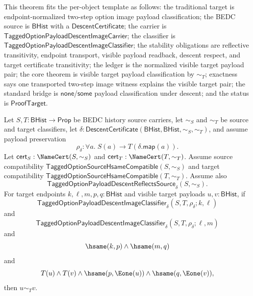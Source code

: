 \begin{theorem}
\label{thm:tagged-option-payload-descent-image-classifier-reflective-transitive-transported-visible-target-payload-classification}
This theorem fits the per-object template as follows: the traditional target is
endpoint-normalized two-step option image payload classification; the BEDC
source is $\mathsf{BHist}$ with a $\mathsf{DescentCertificate}$; the carrier is
$\mathsf{TaggedOptionPayloadDescentImageCarrier}$; the classifier is
$\mathsf{TaggedOptionPayloadDescentImageClassifier}$; the stability obligations
are reflective transitivity, endpoint transport, visible payload readback,
descent respect, and target certificate transitivity; the ledger is the
normalized visible target payload pair; the core theorem is visible target
payload classification by $\sim_T$; exactness says one transported two-step
image witness explains the visible target pair; the standard bridge is
$\mathsf{none}$/$\mathsf{some}$ payload classification under descent; and the
status is $\mathsf{ProofTarget}$.

Let $S,T:\mathsf{BHist}\to\mathsf{Prop}$ be BEDC history source carriers, let
$\sim_S$ and $\sim_T$ be source and target classifiers, let
$\delta:\mathsf{DescentCertificate}(\mathsf{BHist},\mathsf{BHist},\sim_S,\sim_T)$,
and assume payload preservation
$$
\rho_{\delta}:\forall a.\;S(a)\to T(\delta.\mathsf{map}(a)).
$$
Let $\mathsf{cert}_S:\NameCert(S,\sim_S)$ and
$\mathsf{cert}_T:\NameCert(T,\sim_T)$. Assume source compatibility
$\mathsf{TaggedOptionSourceHsameCompatible}(S,\sim_S)$ and target compatibility
$\mathsf{TaggedOptionSourceHsameCompatible}(T,\sim_T)$. Assume also
$$
\mathsf{TaggedOptionPayloadDescentReflectsSource}_{\delta}(S,\sim_S).
$$
For target endpoints $k,\ell,m,p,q:\mathsf{BHist}$ and visible target payloads
$u,v:\mathsf{BHist}$, if
$$
\mathsf{TaggedOptionPayloadDescentImageClassifier}_{\delta}
(S,T,\rho_{\delta};k,\ell)
$$
and
$$
\mathsf{TaggedOptionPayloadDescentImageClassifier}_{\delta}
(S,T,\rho_{\delta};\ell,m)
$$
and
$$
\hsame(k,p)\land \hsame(m,q)
$$
and
$$
T(u)\land T(v)\land
\hsame(p,\Eone(u))\land
\hsame(q,\Eone(v)),
$$
then $u\sim_T v$.
\end{theorem}
